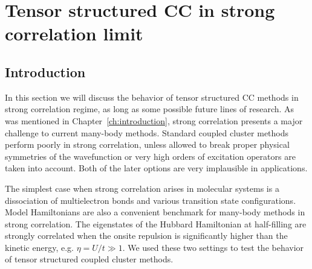 \section{Tensor structured CC in strong correlation limit
\label{sec:strong_correlation}}
\subsection{Introduction}
In this section we will discuss the behavior of tensor structured CC methods 
in strong correlation regime, as long as some possible future lines of 
research. As was mentioned in Chapter~\ref{ch:introduction}, strong correlation 
presents a major challenge to current many-body methods. Standard 
coupled cluster methods perform poorly in strong correlation, unless allowed 
to break proper physical symmetries of the wavefunction or very high orders of 
excitation operators are taken into account. Both of the later options are very 
implausible in applications.

The simplest case when strong correlation arises in molecular systems is a 
dissociation of multielectron bonds and various transition state 
configurations. Model Hamiltonians are also a convenient benchmark for 
many-body methods in strong correlation. The eigenstates of the Hubbard 
Hamiltonian at half-filling are strongly correlated when the onsite repulsion is 
significantly higher than the kinetic energy, e.g. $\eta = U / t \gg 1$. We 
used these two settings to test the behavior of tensor structured coupled 
cluster methods.

